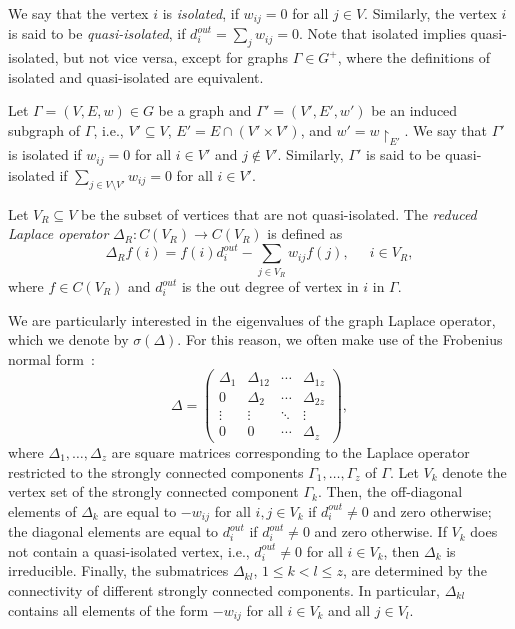 \documentclass{article}
\begin{document}
We say that the vertex $i$ is  \emph{isolated}, if $w_{ij}=0$ for all $j\in V$.
Similarly, the vertex $i$ is said to be \emph{quasi-isolated}, if $d_{i}^{out}=\sum_{j}w_{ij}=0$.
Note that isolated implies quasi-isolated, but not vice versa, except for graphs $\Gamma\in G^{+}$, where the definitions of isolated and quasi-isolated are equivalent. 

Let $\Gamma=(V,E,w)\in G$ be a graph and $\Gamma'=(V',E',w')$ be an induced subgraph of $\Gamma$, i.e., $V'\subseteq V$, $E'=E\cap\left(V'\times V'\right)$, and $w'=w\restriction_{E'}$.
We say that $\Gamma'$ is isolated if $w_{ij}=0$ for all $i\in V'$ and $j\notin V'$. 
Similarly, $\Gamma'$ is said to be quasi-isolated if $\sum_{j\in V\setminus{V'}}w_{ij}=0$ for all $i\in V'$.

Let $V_{R}\subseteq V$ be the subset of vertices that are not quasi-isolated.
The \emph{reduced Laplace operator} $\Delta_{R}\colon C(V_{R})\rightarrow C(V_{R})$ is defined as
\begin{equation}
\Delta_{R} f(i) = f(i)d_{i}^{out} - \sum_{j\in V_{R}}w_{ij}f(j),~\quad~i\in V_{R},
\end{equation}
where $f\in C(V_{R})$ and $d_{i}^{out}$ is the out degree of vertex in $i$ in $\Gamma$.

We are particularly interested in the eigenvalues of the graph Laplace operator, which we denote by $\sigma(\Delta)$.
For this reason, we often make use of the Frobenius normal form~\cite{Brualdi1991}:
\begin{equation}\label{eq:fro-form}
\Delta = \left(\begin{array}{cccc}
		\Delta_{1} & \Delta_{12} & \cdots & \Delta_{1z} \\
		0 & \Delta_{2} & \cdots & \Delta_{2z} \\
		\vdots & \vdots & \ddots & \vdots \\
		0 & 0 & \cdots & \Delta_{z}
		\end{array}\right),
\end{equation} 
where $\Delta_{1},\ldots,\Delta_{z}$ are square matrices corresponding to the Laplace operator restricted to the strongly connected components $\Gamma_{1},\ldots,\Gamma_{z}$ of $\Gamma$.
Let $V_{k}$ denote the vertex set of the strongly connected component $\Gamma_{k}$.
Then, the off-diagonal elements of $\Delta_{k}$ are equal to $-w_{ij}$ for all $i,j\in V_{k}$ if $d_{i}^{out}\neq 0$ and zero otherwise;
the diagonal elements are equal to $d_{i}^{out}$ if $d_{i}^{out}\neq 0$ and zero otherwise.
If $V_{k}$ does not contain a quasi-isolated vertex, i.e., $d_{i}^{out}\neq 0$ for all $i\in V_{k}$, then $\Delta_{k}$ is irreducible.
Finally, the submatrices $\Delta_{kl}$, $1\leq k<l\leq z$, are determined by the connectivity of different strongly connected components. 
In particular, $\Delta_{kl}$ contains all elements of the form $-w_{ij}$ for all $i\in V_{k}$ and all $j\in V_{l}$.
\end{document}
